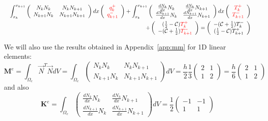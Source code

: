 \begin{itemize}
\begin{eqnarray}
&& \int_{x_k}^{x_{k+1}} 
\left(
\begin{array}{cc}
N_k N_k     & N_k N_{k+1} \\
N_{k+1} N_k & N_{k+1} N_{k+1}
\end{array}
\right)dx
\left(
\begin{array}{c}
    {\color{red}q_k^+}  \\
    {\color{red}q_{k+1}^-}
\end{array}
\right)+
\int_{x_k}^{x_{k+1}} 
\left(
\begin{array}{cc}
\frac{dN_k}{dx} N_k     & \frac{dN_k}{dx} N_{k+1} \\
\frac{dN_{k+1}}{dx} N_k & \frac{dN_{k+1}}{dx} N_{k+1}
\end{array}
\right)dx
\left(
\begin{array}{c}
 {\color{red}T_k^+}  \\
{\color{red}T_{k+1}^-} 
\end{array}
\right) \nonumber \\
&&\qquad+ \left(
\begin{array}{c}
     (\frac{1}{2}-{\cal C}) {\color{red}T_k^+}  \\
     -({\cal C}+\frac{1}{2}){\color{red}T_{k+1}^-} 
\end{array}
\right)
= \left(
\begin{array}{c}
     -({\cal C}+\frac{1}{2})  T_k^- \\
     (\frac{1}{2}-{\cal C})  T_{k+1}^+ 
\end{array}
\right) 
\label{eq:dgT1}
\end{eqnarray}





\end{itemize}


\newpage
We will also use the results obtained in Appendix~\ref{app:mm} for 1D linear elements:
\[
{\bm M}^e
=\int_{\Omega_e} \vec{N}^T \vec{N} dV
=\int_{\Omega_e} 
\left(
\begin{array}{cc}
N_k N_k & N_k N_{k+1} \\
N_{k+1} N_k & N_{k+1}N_{k+1}
\end{array}
\right)
dV 
= \frac{h}{2} \frac{1}{3} 
\left(
\begin{array}{cc}
2  & 1 \\
1 & 2
\end{array}
\right)
= 
\frac{h}{6}
\left(
\begin{array}{cc}
2  & 1 \\
1 & 2
\end{array}
\right)
\]
and also 
\[
{\bm K}^e =
\int_{\Omega_e} 
\left(
\begin{array}{cc}
\frac{dN_k}{dx} N_k     & \frac{dN_k}{dx} N_{k+1} \\
\frac{dN_{k+1}}{dx} N_k & \frac{dN_{k+1}}{dx} N_{k+1}
\end{array}
\right)
dV
=
\frac{1}{2}
\left(
\begin{array}{cc}
-1  & -1 \\
1 & 1
\end{array}
\right)
\]



